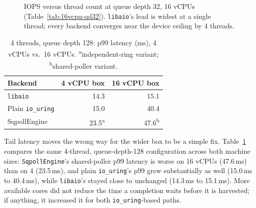 \documentclass[conference]{IEEEtran}
\begin{document}
\begin{figure}[t]
\centering
{}
\caption{IOPS versus thread count at queue depth 32, 16 vCPUs (Table~\ref{tab:16vcpu-qd32}).
\texttt{libaio}'s lead is widest at a single thread; every backend converges near the device
ceiling by 4 threads.}
\label{fig:iops-16vcpu}
\end{figure}

\begin{table}[t]
\centering
\caption{4 threads, queue depth 128: p99 latency (ms), 4 vCPUs vs.\ 16 vCPUs.
\textsuperscript{a}independent-ring variant; \textsuperscript{b}shared-poller variant.}
\label{tab:tail-compare}
\begin{tabular}{lrr}
\toprule
Backend & 4 vCPU box & 16 vCPU box \\
\midrule
\texttt{libaio} & 14.3 & 15.1 \\
Plain \texttt{io\_uring} & 15.0 & 40.4 \\
SqpollEngine & 23.5\textsuperscript{a} & 47.6\textsuperscript{b} \\
\bottomrule
\end{tabular}
\end{table}

Tail latency moves the wrong way for the wider box to be a simple fix. Table~\ref{tab:tail-compare}
compares the same 4-thread, queue-depth-128 configuration across both machine sizes:
\texttt{SqpollEngine}'s shared-poller p99 latency is worse on 16 vCPUs (47.6\,ms) than on 4
(23.5\,ms), and plain \texttt{io\_uring}'s p99 grew substantially as well (15.0\,ms to
40.4\,ms), while \texttt{libaio}'s stayed close to unchanged (14.3\,ms to 15.1\,ms). More
available cores did not reduce the time a completion waits before it is harvested; if anything,
it increased it for both \texttt{io\_uring}-based paths.
\end{document}
